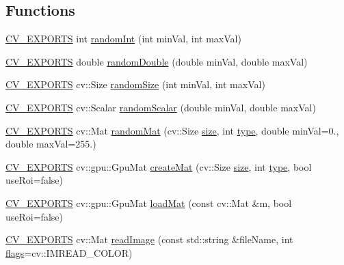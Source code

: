 \subsection*{Functions}
\begin{DoxyCompactItemize}
\item 
\hyperlink{core_2types__c_8h_a1bf9f0e121b54272da02379cfccd0a2b}{C\-V\-\_\-\-E\-X\-P\-O\-R\-T\-S} int \hyperlink{namespacecvtest_a9eac1832de1eb9d633c2239c5d764f45}{random\-Int} (int min\-Val, int max\-Val)
\item 
\hyperlink{core_2types__c_8h_a1bf9f0e121b54272da02379cfccd0a2b}{C\-V\-\_\-\-E\-X\-P\-O\-R\-T\-S} double \hyperlink{namespacecvtest_a0ea150bc084ea73ef92a0af3b404f733}{random\-Double} (double min\-Val, double max\-Val)
\item 
\hyperlink{core_2types__c_8h_a1bf9f0e121b54272da02379cfccd0a2b}{C\-V\-\_\-\-E\-X\-P\-O\-R\-T\-S} cv\-::\-Size \hyperlink{namespacecvtest_ad214be493df2f6a360470007f417c2c4}{random\-Size} (int min\-Val, int max\-Val)
\item 
\hyperlink{core_2types__c_8h_a1bf9f0e121b54272da02379cfccd0a2b}{C\-V\-\_\-\-E\-X\-P\-O\-R\-T\-S} cv\-::\-Scalar \hyperlink{namespacecvtest_af12771814e01f3ebaf94961c36d46185}{random\-Scalar} (double min\-Val, double max\-Val)
\item 
\hyperlink{core_2types__c_8h_a1bf9f0e121b54272da02379cfccd0a2b}{C\-V\-\_\-\-E\-X\-P\-O\-R\-T\-S} cv\-::\-Mat \hyperlink{namespacecvtest_aa1501de3d28a48d8f05c0ce4ce769172}{random\-Mat} (cv\-::\-Size \hyperlink{legacy_8hpp_ae97003f8d5c64cdfb99f6f2606d121b6}{size}, int \hyperlink{imgproc__c_8h_a84612d8738bf935200cf32a103d8efe1}{type}, double min\-Val=0., double max\-Val=255.)
\item 
\hyperlink{core_2types__c_8h_a1bf9f0e121b54272da02379cfccd0a2b}{C\-V\-\_\-\-E\-X\-P\-O\-R\-T\-S} cv\-::gpu\-::\-Gpu\-Mat \hyperlink{namespacecvtest_a7adcf82f14b525d21b8c4f8ed756b778}{create\-Mat} (cv\-::\-Size \hyperlink{legacy_8hpp_ae97003f8d5c64cdfb99f6f2606d121b6}{size}, int \hyperlink{imgproc__c_8h_a84612d8738bf935200cf32a103d8efe1}{type}, bool use\-Roi=false)
\item 
\hyperlink{core_2types__c_8h_a1bf9f0e121b54272da02379cfccd0a2b}{C\-V\-\_\-\-E\-X\-P\-O\-R\-T\-S} cv\-::gpu\-::\-Gpu\-Mat \hyperlink{namespacecvtest_adc16cec6a6ee3add97e870ec5e376226}{load\-Mat} (const cv\-::\-Mat \&m, bool use\-Roi=false)
\item 
\hyperlink{core_2types__c_8h_a1bf9f0e121b54272da02379cfccd0a2b}{C\-V\-\_\-\-E\-X\-P\-O\-R\-T\-S} cv\-::\-Mat \hyperlink{namespacecvtest_ae223362863a0c00baf65b481361fa286}{read\-Image} (const std\-::string \&file\-Name, int \hyperlink{highgui__c_8h_ae51e3a2d4365e85db9630dd3ce9508db}{flags}=cv\-::\-I\-M\-R\-E\-A\-D\-\_\-\-C\-O\-L\-O\-R)

\end{DoxyCompactItemize}
